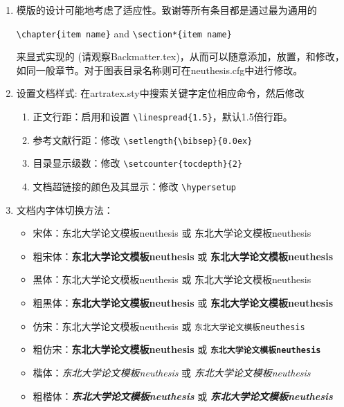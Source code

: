 \begin{enumerate}
    \item 模版的设计可能地考虑了适应性。致谢等所有条目都是通过最为通用的

        \verb+\chapter{item name}+  and \verb+\section*{item name}+

        来显式实现的 (请观察Backmatter.tex)，从而可以随意添加，放置，和修改，如同一般章节。对于图表目录名称则可在neuthesis.cfg中进行修改。

    \item 设置文档样式: 在artratex.sty中搜索关键字定位相应命令，然后修改
        \begin{enumerate}
            \item 正文行距：启用和设置 \verb|\linespread{1.5}|，默认1.5倍行距。
            \item 参考文献行距：修改 \verb|\setlength{\bibsep}{0.0ex}|
            \item 目录显示级数：修改 \verb|\setcounter{tocdepth}{2}|
            \item 文档超链接的颜色及其显示：修改 \verb|\hypersetup|
        \end{enumerate}

    \item 文档内字体切换方法：
        \begin{itemize}
            \item 宋体：东北大学论文模板neuthesis 或 \textrm{东北大学论文模板neuthesis}
            \item 粗宋体：{\bfseries 东北大学论文模板neuthesis} 或 \textbf{东北大学论文模板neuthesis}
            \item 黑体：{\sffamily 东北大学论文模板neuthesis} 或 \textsf{东北大学论文模板neuthesis}
            \item 粗黑体：{\bfseries\sffamily 东北大学论文模板neuthesis} 或 \textsf{\bfseries 东北大学论文模板neuthesis}
            \item 仿宋：{\ttfamily 东北大学论文模板neuthesis} 或 \texttt{东北大学论文模板neuthesis}
            \item 粗仿宋：{\bfseries\ttfamily 东北大学论文模板neuthesis} 或 \texttt{\bfseries 东北大学论文模板neuthesis}
            \item 楷体：{\itshape 东北大学论文模板neuthesis} 或 \textit{东北大学论文模板neuthesis}
            \item 粗楷体：{\bfseries\itshape 东北大学论文模板neuthesis} 或 \textit{\bfseries 东北大学论文模板neuthesis}
        \end{itemize}


\end{enumerate}
